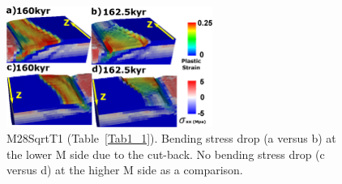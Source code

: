 

\begin{figure}[h]
  \centering
    \includegraphics[width=0.6\textwidth]{./Figures/fig_Results4_6_sqrt_cut_back_bending_drop.eps}
  \caption{M28SqrtT1 (Table~\hyperref[Tab1_1]{\ref{Tab1_1}}). Bending stress drop (a versus b) at the lower M side due to the cut-back. No bending stress drop (c versus d) at the higher M side as a comparison.}
 \label{fig_Results4_6}
\end{figure}

